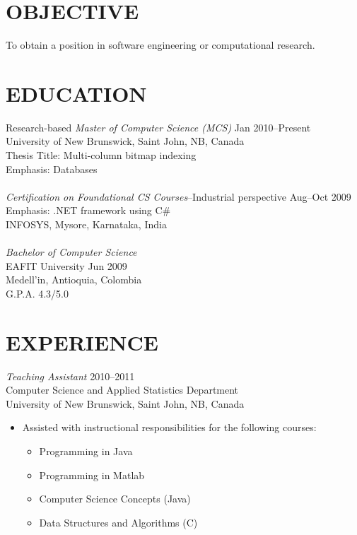 \documentclass[line,margin]{res}
\begin{document}
\address{19603 Fernhaven, Katy, TX 77449}
\address{(281)-398-9692\\eduardo.gutarra@unb.ca}

 
\begin{resume}

\section{ OBJECTIVE} %
\label{sec:objective}
To obtain a position in software engineering or computational research.

\section{ EDUCATION} %
\label{sec:education}
    Research-based {\sl Master of Computer Science (MCS)} \hfill Jan 2010--Present\\
    University of New Brunswick, Saint John, NB, Canada\\
    Thesis Title: Multi-column bitmap indexing\\
    Emphasis: Databases\\\\
    {\sl Certification on Foundational CS Courses}--Industrial perspective \hfill Aug--Oct 2009\\
    Emphasis: .NET framework using C\#\\
    INFOSYS, Mysore, Karnataka, India\\\\
    {\sl Bachelor of Computer Science}\\
    EAFIT University \hfill Jun 2009\\
    Medell\a'in, Antioquia, Colombia\\
    G.P.A. 4.3/5.0\\

\section{ EXPERIENCE} %
\label{sec:experience}

{\sl Teaching Assistant} \hfill 2010--2011\\
Computer Science and Applied Statistics Department\\
University of New Brunswick, Saint John, NB, Canada
\begin{itemize} %
    \item Assisted with instructional responsibilities for the following courses:
    \begin{itemize} \itemsep -2pt
        \item Programming in Java
        \item Programming in Matlab
        \item Computer Science Concepts (Java)
        \item Data Structures and Algorithms (C)
    \end{itemize}
\end{itemize}


\end{resume}
\end{document}
